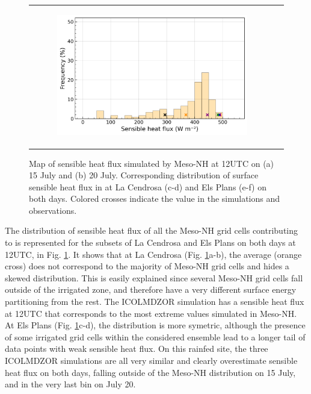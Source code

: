 \begin{figure}[hbtp]
{\begin{tabular}{cc}
\begin{subfigure}[t]{0.48\textwidth}
            \includegraphics[width=\textwidth]{images/chap6/IOP_bins/bins_sens_2021-07-20T12:00:00_elsplans.png}
        \end{subfigure}
    \end{tabular}
    }
    \caption{Map of sensible heat flux simulated by Meso-NH at 12UTC on (a) 15 July and (b) 20 July. Corresponding distribution of surface sensible heat flux in \mesomean at La Cendrosa (c-d) and Els Plans (e-f) on both days. Colored crosses indicate the value in the simulations and observations.}
    \label{fig:sens_bins}
\end{figure}

The distribution of sensible heat flux of all the Meso-NH grid cells contributing to \mesomean is represented for the subsets of La Cendrosa and Els Plans on both days at 12UTC, in Fig. \ref{fig:sens_bins}.
It shows that at La Cendrosa (Fig. \ref{fig:sens_bins}a-b), the \mesomean average (orange cross) does not correspond to the majority of Meso-NH grid cells and hides a skewed distribution. This is easily explained since several Meso-NH grid cells fall outside of the irrigated zone, and therefore have a very different surface energy partitioning from the rest.
The ICOLMDZOR \noirr simulation has a sensible heat flux at 12UTC that corresponds to the most extreme values simulated in Meso-NH.
At Els Plans (Fig. \ref{fig:sens_bins}c-d), the distribution is more symetric, although the presence of some irrigated grid cells within the considered ensemble lead to a longer tail of data points with weak sensible heat flux.
On this rainfed site, the three ICOLMDZOR simulations are all very similar and clearly overestimate sensible heat flux on both days, falling outside of the Meso-NH distribution on 15 July, and in the very last bin on July 20.

